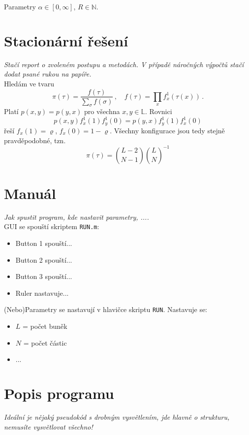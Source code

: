 \documentclass[a4paper, 12pt, fleqn]{article}
\begin{document}
\noindent Parametry $\alpha\in[0,\infty]$, $R\in\mathbb{N}$.

\section*{Stacionární řešení}
\emph{Stačí report o zvoleném postupu a metodách. V případě náročných výpočtů stačí dodat psané rukou na papíře.}\\

Hledám ve tvaru
\[
	\pi(\tau)=\frac{f(\tau)}{\sum_\sigma f(\sigma)}\,,\quad f(\tau)=\prod_x f_x^1(\tau(x))\,.
\]
Platí $p(x,y)=p(y,x)$ pro všechna $x,y\in\mathbb{L}$. Rovnici
\[
	p(x,y)f_x^1(1)f_y^1(0)=p(y,x)f_y^1(1)f_x^1(0)
\]
řeší $f_x(1)=\varrho$, $f_{x}(0)=1-\varrho$. Všechny konfigurace jsou tedy stejně pravděpodobné, tzn.
\[
	\pi(\tau)={L-2\choose N-1}{L\choose N}^{-1}
\]

\section*{Manuál}
\emph{Jak spustit program, kde nastavit parametry, ....}\\

GUI se spouští skriptem \verb+RUN.m+:
\begin{center}
\end{center}

\begin{itemize}
	\item Button 1 spouští...
	\item Button 2 spouští...
	\item Button 3 spouští...
	\item Ruler nastavuje...
\end{itemize}

\noindent (Nebo)Parametry se nastavují v hlavičce skriptu \verb+RUN+. Nastavuje se:
\begin{itemize}
	\item $L$ = počet buněk
	\item $N$ = počet částic
	\item ...
\end{itemize}


\section*{Popis programu}
\emph{Ideální je nějaký pseudokód s drobným vysvětlením, jde hlavně o strukturu, nemusíte vysvětlovat všechno!}\\
\end{document}
